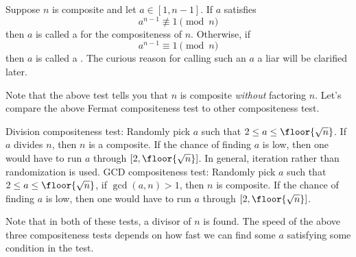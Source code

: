 \begin{defn}
  Suppose $n$ is composite and let $a \in [1, n-1]$.
  If $a$ satisfies
  \[
  a^{n - 1} \not\equiv 1 \pmod{n}
  \]
  then $a$ is called a  for the compositeness of $n$.
  Otherwise, if
  \[
  a^{n - 1} \equiv 1 \pmod{n}
  \]
  then $a$ is called a .
  The curious reason for calling such an $a$ a liar will be clarified later.
\end{defn}

Note that the above test tells you that $n$ is composite
\textit{without} factoring $n$.
Let's compare the above Fermat compositeness test to other compositeness test.
\begin{enumerate}[nosep]
  \li Division compositeness test:
  Randomly pick $a$ such that $2 \leq a \leq \floor{\sqrt{n}}$.
  If $a$ divides $n$, then $n$ is a composite.
  If the chance of finding $a$ is low, then one would have to
  run $a$ through $[2, \floor{\sqrt{n}}]$.
  In general, iteration rather than randomization is used.
  \li GCD compositeness test:
  Randomly pick $a$ such that $2 \leq a \leq \floor{\sqrt{n}}$,
  if $\gcd(a, n) > 1$, then
  $n$ is composite.
  If the chance of finding $a$ is low, then one would have to
  run $a$ through $[2, \floor{\sqrt{n}}]$.
\end{enumerate}
Note that in both of these tests, a divisor of $n$ is found.
The speed of the above three compositeness tests depends on how fast we can
find some $a$ satisfying some condition in the test.

